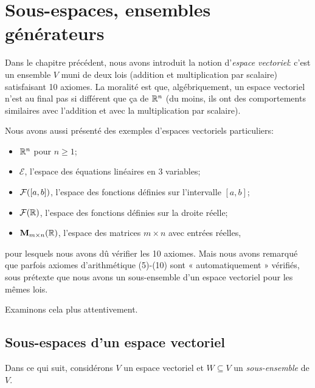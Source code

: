 \chapter{Sous-espaces, ensembles g\'en\'erateurs}\label{chapter:Fr_05-subspaces}

Dans le chapitre pr\'ec\'edent, nous avons introduit la notion d'\emph{espace
vectoriel}: c'est un ensemble $V$ muni de deux
lois (addition et multiplication par scalaire) satisfaisant 10 axiomes. 
La moralité est que, algébriquement, un espace vectoriel n'est au final pas
si diff\'erent que ça de $\mathbb{R}^n$ (du moins, ils ont des comportements similaires avec l'addition
et avec la multiplication par scalaire).

Nous avons aussi présenté des exemples d'espaces vectoriels particuliers:

\begin{itemize}
\item
  $\mathbb{R}^n$ pour $n\geq 1$;
\item
  $\mathcal{E}$, l'espace des équations linéaires en 3 variables;
\item
  $\mathcal{F}([a,b])$, l'espace des fonctions d\'efinies sur l'intervalle $[a,b]$;
\item
  $\mathcal{F}(\mathbb{R})$, l'espace des fonctions d\'efinies sur la droite réelle;
\item
  $\mathbf{M}_{m\times n}(\mathbb{R})$, l'espace des matrices $m\times n$ avec entr\'ees réelles,
\end{itemize}

\noindent pour lesquels nous avons dû vérifier les 10 axiomes. Mais nous avons
remarqué que parfois axiomes d'arithm\'etique (5)-(10) sont « automatiquement » vérifiés, sous prétexte que nous avons un sous-ensemble d'un espace vectoriel pour les mêmes lois.

Examinons cela plus attentivement.

\section{Sous-espaces d'un espace vectoriel}\label{subsets-of-vectors-spaces}

Dans ce qui suit, considérons $V$ un espace vectoriel et $W \subseteq V$
un \emph{sous-ensemble} de $V$.

